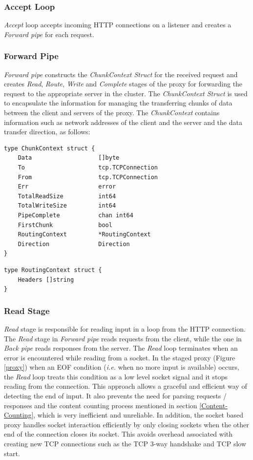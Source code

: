\documentclass[a4paper,11pt,twoside]{report}
\begin{document}
\subsubsection*{Accept Loop} 
\textit{Accept} loop accepts incoming HTTP connections on a listener and creates a \textit{Forward pipe} for each request.

\subsubsection*{Forward Pipe} 
\textit{Forward pipe} constructs the \textit{ChunkContext Struct} for the received request and creates \textit{Read}, \textit{Route}, \textit{Write} and \textit{Complete} stages of the proxy for forwarding the request to the appropriate server in the cluster. The \textit{ChunkContext Struct} is used to encapsulate the information for managing the transferring chunks of data between the client and servers of the proxy. The \textit{ChunkContext} contains information such as network addresses of the client and the server and the data transfer direction, as follows: \bigskip  

\begin{lstlisting}[language=terminal]
type ChunkContext struct {
	Data                   []byte
	To                     tcp.TCPConnection
	From                   tcp.TCPConnection
	Err                    error
	TotalReadSize          int64
	TotalWriteSize         int64
	PipeComplete           chan int64
	FirstChunk             bool
	RoutingContext         *RoutingContext
	Direction              Direction
}
\end{lstlisting}

\begin{lstlisting}[language=terminal]
type RoutingContext struct {
	Headers []string
}
\end{lstlisting} 

\subsubsection*{Read Stage} 
\textit{Read} stage is responsible for reading input in a loop from the HTTP connection. The \textit{Read} stage in \textit{Forward pipe} reads requests from the client, while the one in \textit{Back pipe} reads responses from the server. The \textit{Read} loop terminates when an error is encountered while reading from a socket. In the staged proxy (Figure \ref{proxy}) when an EOF condition (\textit{i.e.} when no more input is available) occurs, the \textit{Read} loop treats this condition as a low level socket signal and it stops reading from the connection. This approach allows a graceful and efficient way of detecting the end of input. It also prevents the need for parsing requests / responses and the content counting process mentioned in section \ref{Content-Counting}, which is very inefficient and unreliable.  In addition, the socket based proxy handles socket interaction efficiently by only closing sockets when the other end of the connection closes its socket.  This avoids overhead associated with creating new TCP connections such as the TCP 3-way handshake and TCP slow start.
\end{document}
